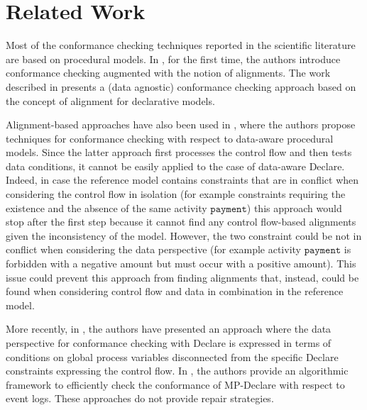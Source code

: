 \section{Related Work}
\label{sec:related}

Most of the conformance checking techniques reported in the scientific literature are based on procedural models. In \cite{DBLP:conf/edoc/AdriansyahDA11}, for the first time, the authors introduce conformance checking augmented with the notion of alignments. The work described in \cite{LeoniMA12} presents a (data agnostic) conformance checking approach based on the concept of alignment for declarative models.

Alignment-based approaches have also been used in \cite{MultiPerspective}, where the authors propose techniques for conformance checking with respect to data-aware procedural models. Since the latter approach first processes the control flow and then tests data conditions, it cannot be easily applied to the case of data-aware Declare. Indeed, in case the reference model contains constraints that are in conflict when considering the control flow in isolation (for example constraints requiring the existence and the absence of the same activity $\texttt{payment}$) this approach would stop after the first step because it cannot find any control flow-based alignments given the inconsistency of the model. However, the two constraint could be not in conflict when considering the data perspective (for example activity $\texttt{payment}$ is forbidden with a negative amount but must occur with a positive amount). This issue could prevent this approach from finding alignments that, instead, could be found when considering control flow and data in combination in the reference model.

More recently, in \cite{Borrego014}, the authors have presented an approach where the data perspective for conformance checking with Declare is expressed in terms of conditions on global process variables disconnected from the specific Declare constraints expressing the control flow. In \cite{BurattinMS16}, the authors provide an algorithmic framework to efficiently check the conformance of MP-Declare with respect to event logs. These approaches do not provide repair strategies. 